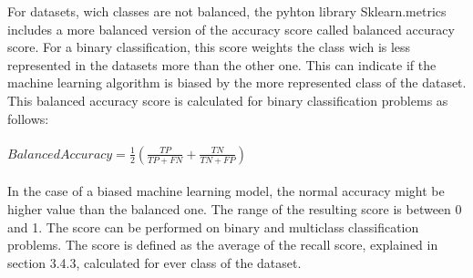 \documentclass[../masterarbeit.tex]{subfiles}
\begin{document}
For datasets, wich classes are not balanced, the pyhton library Sklearn.metrics includes a more balanced version of the accuracy score called balanced accuracy score. For a binary classification, this score weights the class wich is less represented in the datasets more than the other one. This can indicate if the machine learning algorithm is biased by the more represented class of the dataset. \autocites{Scikit-model-evaluation:2022}
This balanced accuracy score is calculated for binary classification problems as follows: \\~\\
\(Balanced Accuracy = \frac{1}{2}(\frac{TP}{TP + FN} + \frac{TN}{TN + FP}) \) \hfill \textcite[]{Scikit-model-evaluation:2022} \\~\\
In the case of a biased machine learning model, the normal accuracy might be higher value than the balanced one. The range of the resulting score is between 0 and 1. The score can be performed on binary and multiclass classification problems. The score is defined as the average of the recall score, explained in section 3.4.3, calculated for ever class of the dataset.\autocites{Scikit-model-evaluation:2022}
\end{document}
